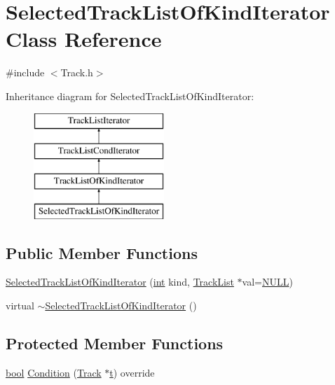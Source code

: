 \hypertarget{class_selected_track_list_of_kind_iterator}{}\section{Selected\+Track\+List\+Of\+Kind\+Iterator Class Reference}
\label{class_selected_track_list_of_kind_iterator}


{\ttfamily \#include $<$Track.\+h$>$}

Inheritance diagram for Selected\+Track\+List\+Of\+Kind\+Iterator\+:\begin{figure}[H]
\begin{center}
\leavevmode
\includegraphics[height=4.000000cm]{class_selected_track_list_of_kind_iterator}
\end{center}
\end{figure}
\subsection*{Public Member Functions}
\begin{DoxyCompactItemize}
\item 
\hyperlink{class_selected_track_list_of_kind_iterator_a792b87275965586c475140ecea36c39d}{Selected\+Track\+List\+Of\+Kind\+Iterator} (\hyperlink{xmltok_8h_a5a0d4a5641ce434f1d23533f2b2e6653}{int} kind, \hyperlink{class_track_list}{Track\+List} $\ast$val=\hyperlink{px__mixer_8h_a070d2ce7b6bb7e5c05602aa8c308d0c4}{N\+U\+LL})
\item 
virtual \hyperlink{class_selected_track_list_of_kind_iterator_a9c6a99bab581c3d35dc2490c0ded4729}{$\sim$\+Selected\+Track\+List\+Of\+Kind\+Iterator} ()
\end{DoxyCompactItemize}
\subsection*{Protected Member Functions}
\begin{DoxyCompactItemize}
\item 
\hyperlink{mac_2config_2i386_2lib-src_2libsoxr_2soxr-config_8h_abb452686968e48b67397da5f97445f5b}{bool} \hyperlink{class_selected_track_list_of_kind_iterator_ab307749fb203b297f07a9e10bccc750f}{Condition} (\hyperlink{class_track}{Track} $\ast$\hyperlink{octave__test_8m_aaccc9105df5383111407fd5b41255e23}{t}) override
\end{DoxyCompactItemize}
